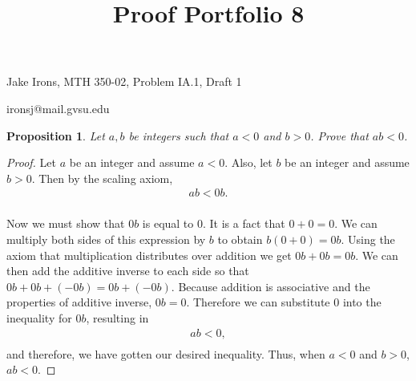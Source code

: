 \documentclass[11 pt]{article}
\title{Proof Portfolio 8}
\newtheorem{proposition}{Proposition}
\newcommand{\newpar}{\vspace{.15in}\noindent}
\begin{document}
\noindent Jake Irons, MTH 350-02, Problem IA.1, Draft 1

\noindent ironsj@mail.gvsu.edu

\newpar
\begin{proposition}
Let $a, b$ be integers such that $a < 0$ and $b > 0$. Prove that $ab < 0$.
\end{proposition}
\begin{proof}
Let $a$ be an integer and assume $a<0$. Also, let $b$ be an integer and assume $b>0$. Then by the scaling axiom, 
\begin{align*}
ab<0b. \\
\end{align*}

\newpar
Now we must show that $0b$ is equal to 0. It is a fact that $0+0=0$. We can multiply both sides of this expression by $b$ to obtain $b(0+0)=0b$. Using the axiom that multiplication distributes over addition we get $0b+0b=0b$. We can then add the additive inverse to each side so that $0b+0b+(-0b)=0b+(-0b)$. Because addition is associative and the properties of additive inverse, $0b=0$. Therefore we can substitute 0 into the inequality for $0b$, resulting in
\begin{align*}
ab<0, \\
\end{align*}
and therefore, we have gotten our desired inequality. Thus, when $a<0$ and $b>0$, $ab<0$.


\end{proof}
\end{document}
